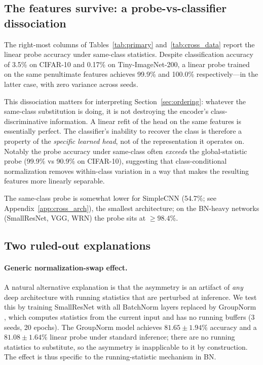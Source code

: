 \documentclass{article}
\begin{document}
\subsection{The features survive: a probe-vs-classifier dissociation}
\label{sec:probe}

The right-most columns of Tables~\ref{tab:primary} and~\ref{tab:cross_data} report the linear probe accuracy under same-class statistics. Despite classification accuracy of 3.5\% on CIFAR-10 and 0.17\% on Tiny-ImageNet-200, a linear probe trained on the same penultimate features achieves 99.9\% and 100.0\% respectively---in the latter case, with zero variance across seeds.

This dissociation matters for interpreting Section~\ref{sec:ordering}: whatever the same-class substitution is doing, it is not destroying the encoder's class-discriminative information. A linear refit of the head on the same features is essentially perfect. The classifier's inability to recover the class is therefore a property of the \emph{specific learned head}, not of the representation it operates on. Notably the probe accuracy under same-class often \emph{exceeds} the global-statistic probe (99.9\% vs 90.9\% on CIFAR-10), suggesting that class-conditional normalization removes within-class variation in a way that makes the resulting features more linearly separable.

The same-class probe is somewhat lower for SimpleCNN (54.7\%; see Appendix~\ref{app:cross_arch}), the smallest architecture; on the BN-heavy networks (SmallResNet, VGG, WRN) the probe sits at $\geq 98.4\%$.

\subsection{Two ruled-out explanations}
\label{sec:controls}

\paragraph{Generic normalization-swap effect.} A natural alternative explanation is that the asymmetry is an artifact of \emph{any} deep architecture with running statistics that are perturbed at inference. We test this by training SmallResNet with all BatchNorm layers replaced by GroupNorm \citep{wu2018group}, which computes statistics from the current input and has no running buffers (3 seeds, 20 epochs). The GroupNorm model achieves $81.65\pm 1.94\%$ accuracy and a $81.08\pm 1.64\%$ linear probe under standard inference; there are no running statistics to substitute, so the asymmetry is inapplicable to it by construction. The effect is thus specific to the running-statistic mechanism in BN.
\end{document}
